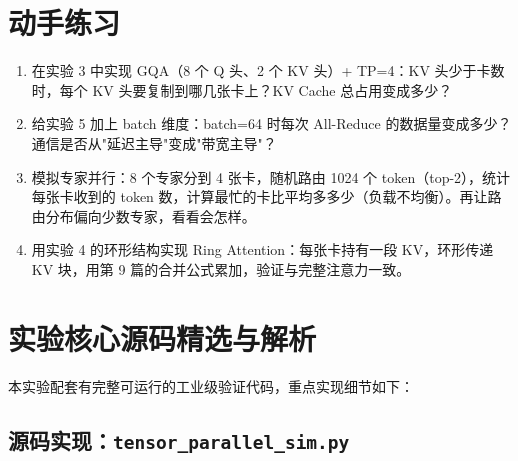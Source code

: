 \section{动手练习}

\begin{enumerate}
  \item 在实验 3 中实现 GQA（8 个 Q 头、2 个 KV 头）+ TP=4：KV 头少于卡数时，每个 KV 头要复制到哪几张卡上？KV Cache 总占用变成多少？
  \item 给实验 5 加上 batch 维度：batch=64 时每次 All-Reduce 的数据量变成多少？通信是否从"延迟主导"变成"带宽主导"？
  \item 模拟专家并行：8 个专家分到 4 张卡，随机路由 1024 个 token（top-2），统计每张卡收到的 token 数，计算最忙的卡比平均多多少（负载不均衡）。再让路由分布偏向少数专家，看看会怎样。
  \item 用实验 4 的环形结构实现 Ring Attention：每张卡持有一段 KV，环形传递 KV 块，用第 9 篇的合并公式累加，验证与完整注意力一致。
\end{enumerate}



\section{实验核心源码精选与解析}

本实验配套有完整可运行的工业级验证代码，重点实现细节如下：


\subsection{源码实现：\texttt{tensor\_parallel\_sim.py}}



